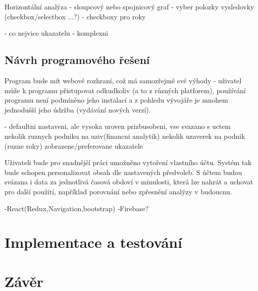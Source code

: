 Horizontální analýza
- sloupcový nebo spojnicový graf
- vyber polozky vysledovky (checkbox/selectbox ...?)
- checkboxy pro roky

- co nejvice ukazatelu - komplexni

\section{Návrh programového řešení}
Program bude mít webové rozhraní, což má samozřejmě své výhody - uživatel může k programu přistupovat odkudkoliv (a to z různých platforem), používání programu není podmíněno jeho instalací a z pohledu vývojáře je mnohem jednodušší jeho údržba (vydávání nových verzí).

- defaultni nastaveni, ale vysoka uroven prizbusobeni, vse svazano s uctem
 nekolik ruznych podniku na uziv(financni analytik)
 nekolik uzaverek na podnik (ruzne roky)
 zobrazene/preferovane ukazatele
 

Uživateli bude pro snadnější práci umožněno vytoření vlastního účtu. Systém tak bude schopen personalizovat obsah dle nastavených předvoleb. S účtem budou svázana i data za jednotlivá časová obdoví v minulosti, která lze nahrát a uchovat pro další použití, například porovnání nebo zpřesnění analýzy v budoucnu.

-React(Redux,Navigation,bootstrap)
-Firebase?
\chapter{Implementace a testování}
\chapter{Závěr}

